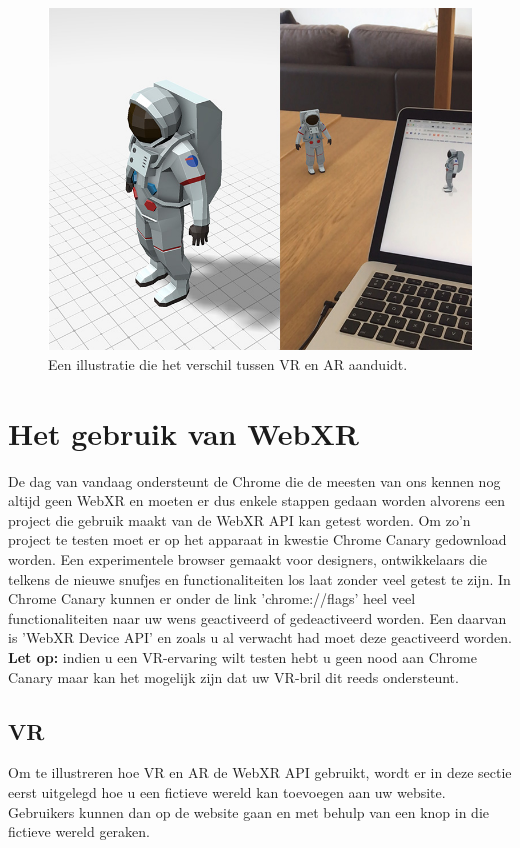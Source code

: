 \begin{figure}
	\includegraphics[width=\linewidth]{img/VrAr.jpg}
	\caption{Een illustratie die het verschil tussen VR en AR aanduidt.}
	\label{fig-ar-vr}
\end{figure}

\section{Het gebruik van WebXR}
\label{src:het-gebruik-van-webxr}
De dag van vandaag ondersteunt de Chrome die de meesten van ons kennen nog altijd geen WebXR en moeten er dus enkele stappen gedaan worden alvorens een project die gebruik maakt van de WebXR API kan getest worden. Om zo'n project te testen moet er op het apparaat in kwestie Chrome Canary gedownload worden. Een experimentele browser gemaakt voor designers, ontwikkelaars die telkens de nieuwe snufjes en functionaliteiten los laat zonder veel getest te zijn. In Chrome Canary kunnen er onder de link 'chrome://flags' heel veel functionaliteiten naar uw wens geactiveerd of gedeactiveerd worden. Een daarvan is 'WebXR Device API' en zoals u al verwacht had moet deze geactiveerd worden. 
\textbf{Let op:} indien u een VR-ervaring wilt testen hebt u geen nood aan Chrome Canary maar kan het mogelijk zijn dat uw VR-bril dit reeds ondersteunt.


\subsection{VR}
\label{src:vr}
Om te illustreren hoe VR en AR de WebXR API gebruikt, wordt er in deze sectie eerst uitgelegd hoe u een fictieve wereld kan toevoegen aan uw website. Gebruikers kunnen dan op de website gaan en met behulp van een knop in die fictieve wereld geraken. 

